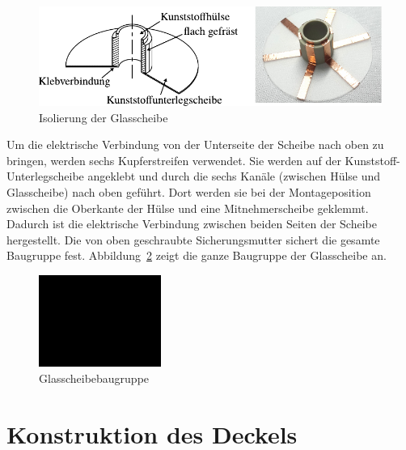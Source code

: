 \begin{figure}[htb]
    \centering
    \includegraphics[]{./images/isolierung_der_scheibe.pdf}
    \caption{Isolierung der Glasscheibe}
    \label{fig:isolierung_der_glassscheibe}
\end{figure}

Um die elektrische Verbindung von der Unterseite der Scheibe nach oben zu bringen, werden sechs Kupferstreifen verwendet.
Sie werden auf der Kunststoff-Unterlegscheibe angeklebt und durch die sechs Kanäle (zwischen Hülse und Glasscheibe) nach oben geführt.
Dort werden sie bei der Montageposition zwischen die Oberkante der Hülse und eine Mitnehmerscheibe geklemmt.
Dadurch ist die elektrische Verbindung zwischen beiden Seiten der Scheibe hergestellt.
Die von oben geschraubte Sicherungsmutter sichert die gesamte Baugruppe fest.
Abbildung~\ref{fig:glasscheibebaugruppe} zeigt die ganze Baugruppe der Glasscheibe an.

\begin{figure}[htb]
    \centering
    \includegraphics[width=4cm]{./images/blank_img.jpg}
    \caption{Glasscheibebaugruppe}
    \label{fig:glasscheibebaugruppe}
\end{figure}

\section{Konstruktion des Deckels}
\label{sec:konstruktion_des_deckels}

